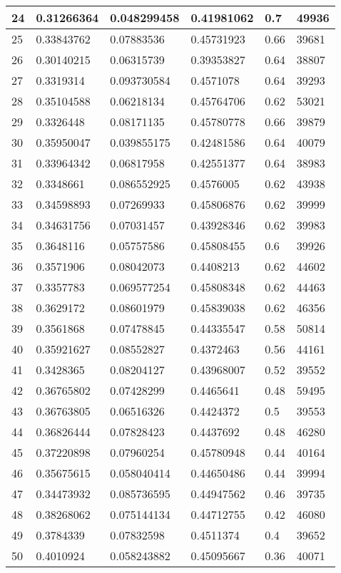 \begin{longtable}{|l|l|l|l|l|l|}
24 & 0.31266364 & 0.048299458 & 0.41981062 & 0.7 & 49936 \\ \hline 
25 & 0.33843762 & 0.07883536 & 0.45731923 & 0.66 & 39681 \\ \hline 
26 & 0.30140215 & 0.06315739 & 0.39353827 & 0.64 & 38807 \\ \hline 
27 & 0.3319314 & 0.093730584 & 0.4571078 & 0.64 & 39293 \\ \hline 
28 & 0.35104588 & 0.06218134 & 0.45764706 & 0.62 & 53021 \\ \hline 
29 & 0.3326448 & 0.08171135 & 0.45780778 & 0.66 & 39879 \\ \hline 
30 & 0.35950047 & 0.039855175 & 0.42481586 & 0.64 & 40079 \\ \hline 
31 & 0.33964342 & 0.06817958 & 0.42551377 & 0.64 & 38983 \\ \hline 
32 & 0.3348661 & 0.086552925 & 0.4576005 & 0.62 & 43938 \\ \hline 
33 & 0.34598893 & 0.07269933 & 0.45806876 & 0.62 & 39999 \\ \hline 
34 & 0.34631756 & 0.07031457 & 0.43928346 & 0.62 & 39983 \\ \hline 
35 & 0.3648116 & 0.05757586 & 0.45808455 & 0.6 & 39926 \\ \hline 
36 & 0.3571906 & 0.08042073 & 0.4408213 & 0.62 & 44602 \\ \hline 
37 & 0.3357783 & 0.069577254 & 0.45808348 & 0.62 & 44463 \\ \hline 
38 & 0.3629172 & 0.08601979 & 0.45839038 & 0.62 & 46356 \\ \hline 
39 & 0.3561868 & 0.07478845 & 0.44335547 & 0.58 & 50814 \\ \hline 
40 & 0.35921627 & 0.08552827 & 0.4372463 & 0.56 & 44161 \\ \hline 
41 & 0.3428365 & 0.08204127 & 0.43968007 & 0.52 & 39552 \\ \hline 
42 & 0.36765802 & 0.07428299 & 0.4465641 & 0.48 & 59495 \\ \hline 
43 & 0.36763805 & 0.06516326 & 0.4424372 & 0.5 & 39553 \\ \hline 
44 & 0.36826444 & 0.07828423 & 0.4437692 & 0.48 & 46280 \\ \hline 
45 & 0.37220898 & 0.07960254 & 0.45780948 & 0.44 & 40164 \\ \hline 
46 & 0.35675615 & 0.058040414 & 0.44650486 & 0.44 & 39994 \\ \hline 
47 & 0.34473932 & 0.085736595 & 0.44947562 & 0.46 & 39735 \\ \hline 
48 & 0.38268062 & 0.075144134 & 0.44712755 & 0.42 & 46080 \\ \hline 
49 & 0.3784339 & 0.07832598 & 0.4511374 & 0.4 & 39652 \\ \hline 
50 & 0.4010924 & 0.058243882 & 0.45095667 & 0.36 & 40071 \\ \hline 
\end{longtable}